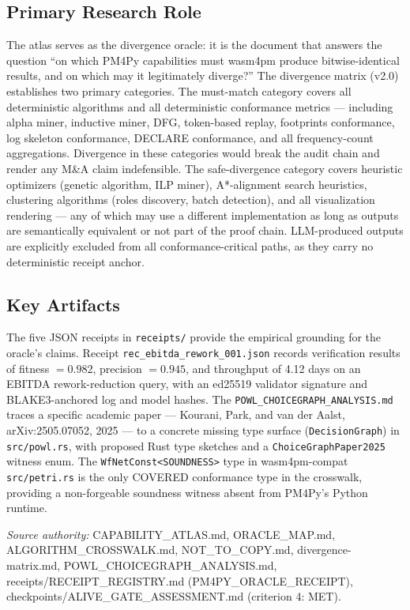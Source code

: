\subsection{Primary Research Role}
\label{sec:sources-pm4py-identity-role}

The atlas serves as the divergence oracle: it is the document that answers the question
``on which PM4Py capabilities must wasm4pm produce bitwise-identical results, and on which
may it legitimately diverge?'' The divergence matrix (v2.0) establishes two primary categories.
The must-match category covers all deterministic algorithms and all deterministic conformance
metrics --- including alpha miner, inductive miner, DFG, token-based replay, footprints
conformance, log skeleton conformance, DECLARE conformance, and all frequency-count
aggregations. Divergence in these categories would break the audit chain and render any
M\&A claim indefensible. The safe-divergence category covers heuristic optimizers (genetic
algorithm, ILP miner), A*-alignment search heuristics, clustering algorithms (roles
discovery, batch detection), and all visualization rendering --- any of which may use a
different implementation as long as outputs are semantically equivalent or not part of
the proof chain. LLM-produced outputs are explicitly excluded from all conformance-critical
paths, as they carry no deterministic receipt anchor.

\subsection{Key Artifacts}
\label{sec:sources-pm4py-identity-artifacts}

The five JSON receipts in \texttt{receipts/} provide the empirical grounding for the
oracle's claims. Receipt \texttt{rec\_ebitda\_rework\_001.json} records verification results
of fitness $= 0.982$, precision $= 0.945$, and throughput of 4.12 days on an EBITDA
rework-reduction query, with an ed25519 validator signature and BLAKE3-anchored log and
model hashes. The \texttt{POWL\_CHOICEGRAPH\_ANALYSIS.md} traces a specific academic paper
--- Kourani, Park, and van der Aalst, arXiv:2505.07052, 2025 --- to a concrete missing type
surface (\texttt{DecisionGraph}) in \texttt{src/powl.rs}, with proposed Rust type sketches
and a \texttt{ChoiceGraphPaper2025} witness enum. The \texttt{WfNetConst<SOUNDNESS>} type
in wasm4pm-compat \texttt{src/petri.rs} is the only COVERED conformance type in the
crosswalk, providing a non-forgeable soundness witness absent from PM4Py's Python runtime.

\bigskip
\noindent\textit{Source authority:} CAPABILITY\_ATLAS.md, ORACLE\_MAP.md,
ALGORITHM\_CROSSWALK.md, NOT\_TO\_COPY.md, divergence-matrix.md,
POWL\_CHOICEGRAPH\_ANALYSIS.md, receipts/RECEIPT\_REGISTRY.md (PM4PY\_ORACLE\_RECEIPT),
checkpoints/ALIVE\_GATE\_ASSESSMENT.md (criterion 4: MET).
